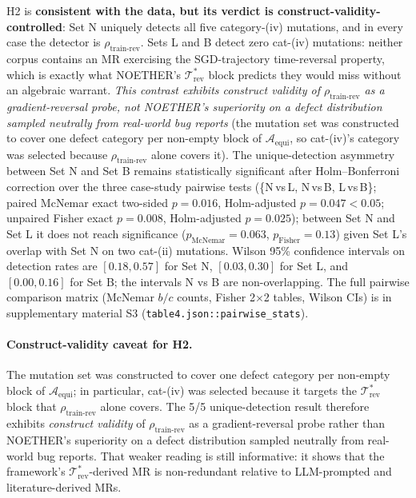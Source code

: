 \documentclass[manuscript]{acmart}
\begin{document}
H2 is \textbf{consistent with the data, but its verdict is construct-validity-controlled}: Set N uniquely detects all five category-(iv) mutations, and in every case the detector is $\rho_{\mathrm{train\text{-}rev}}$. Sets L and B detect zero cat-(iv) mutations: neither corpus contains an MR exercising the SGD-trajectory time-reversal property, which is exactly what NOETHER's $\mathcal{T}^{*}_{\mathrm{rev}}$ block predicts they would miss without an algebraic warrant. \emph{This contrast exhibits construct validity of $\rho_{\mathrm{train\text{-}rev}}$ as a gradient-reversal probe, not NOETHER's superiority on a defect distribution sampled neutrally from real-world bug reports} (the mutation set was constructed to cover one defect category per non-empty block of $\mathcal{A}_{\mathrm{equi}}$, so cat-(iv)'s category was selected because $\rho_{\mathrm{train\text{-}rev}}$ alone covers it). The unique-detection asymmetry between Set N and Set B remains statistically significant after Holm--Bonferroni correction over the three case-study pairwise tests (\{N\,vs\,L, N\,vs\,B, L\,vs\,B\}; paired McNemar exact two-sided $p = 0.016$, Holm-adjusted $p = 0.047 < 0.05$; unpaired Fisher exact $p = 0.008$, Holm-adjusted $p = 0.025$); between Set N and Set L it does not reach significance ($p_\mathrm{McNemar} = 0.063$, $p_\mathrm{Fisher} = 0.13$) given Set L's overlap with Set N on two cat-(ii) mutations. Wilson 95\% confidence intervals on detection rates are $[0.18, 0.57]$ for Set N, $[0.03, 0.30]$ for Set L, and $[0.00, 0.16]$ for Set B; the intervals N vs B are non-overlapping. The full pairwise comparison matrix (McNemar $b/c$ counts, Fisher 2$\times$2 tables, Wilson CIs) is in supplementary material S3 (\texttt{table4.json::pairwise\_stats}).

\paragraph{Construct-validity caveat for H2.}
The mutation set was constructed to cover one defect category per non-empty block of $\mathcal{A}_{\mathrm{equi}}$; in particular, cat-(iv) was selected because it targets the $\mathcal{T}^{*}_{\mathrm{rev}}$ block that $\rho_{\mathrm{train\text{-}rev}}$ alone covers. The 5/5 unique-detection result therefore exhibits \emph{construct validity} of $\rho_{\mathrm{train\text{-}rev}}$ as a gradient-reversal probe rather than NOETHER's superiority on a defect distribution sampled neutrally from real-world bug reports. That weaker reading is still informative: it shows that the framework's $\mathcal{T}^{*}_{\mathrm{rev}}$-derived MR is non-redundant relative to LLM-prompted and literature-derived MRs.
\end{document}
